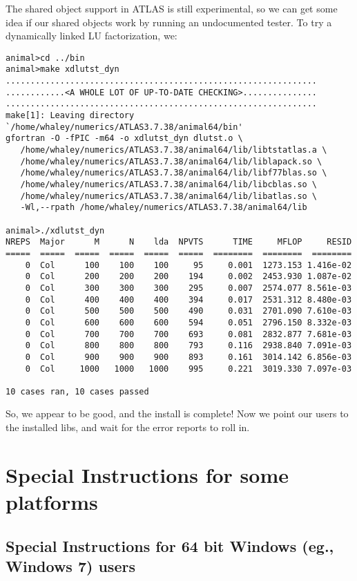 \documentclass[11pt]{article}
\begin{document}
The shared object support in ATLAS is still experimental, so we
can get some idea if our shared objects work by running an undocumented
tester.  To try a dynamically linked LU factorization, we:
\begin{footnotesize}
\begin{verbatim}
animal>cd ../bin
animal>make xdlutst_dyn
...............................................................
............<A WHOLE LOT OF UP-TO-DATE CHECKING>...............
...............................................................
make[1]: Leaving directory `/home/whaley/numerics/ATLAS3.7.38/animal64/bin'
gfortran -O -fPIC -m64 -o xdlutst_dyn dlutst.o \
   /home/whaley/numerics/ATLAS3.7.38/animal64/lib/libtstatlas.a \
   /home/whaley/numerics/ATLAS3.7.38/animal64/lib/liblapack.so \
   /home/whaley/numerics/ATLAS3.7.38/animal64/lib/libf77blas.so \
   /home/whaley/numerics/ATLAS3.7.38/animal64/lib/libcblas.so \
   /home/whaley/numerics/ATLAS3.7.38/animal64/lib/libatlas.so \
   -Wl,--rpath /home/whaley/numerics/ATLAS3.7.38/animal64/lib

animal>./xdlutst_dyn
NREPS  Major      M      N    lda  NPVTS      TIME     MFLOP     RESID
=====  =====  =====  =====  =====  =====  ========  ========  ========
    0  Col      100    100    100     95     0.001  1273.153 1.416e-02
    0  Col      200    200    200    194     0.002  2453.930 1.087e-02
    0  Col      300    300    300    295     0.007  2574.077 8.561e-03
    0  Col      400    400    400    394     0.017  2531.312 8.480e-03
    0  Col      500    500    500    490     0.031  2701.090 7.610e-03
    0  Col      600    600    600    594     0.051  2796.150 8.332e-03
    0  Col      700    700    700    693     0.081  2832.877 7.681e-03
    0  Col      800    800    800    793     0.116  2938.840 7.091e-03
    0  Col      900    900    900    893     0.161  3014.142 6.856e-03
    0  Col     1000   1000   1000    995     0.221  3019.330 7.097e-03

10 cases ran, 10 cases passed
\end{verbatim}
\end{footnotesize}
So, we appear to be good, and the install is complete!  Now we point our
users to the installed libs, and wait for the error reports to roll in.

\section{Special Instructions for some platforms}
\subsection{Special Instructions for 64 bit Windows (eg., Windows 7) users}
\label{sec-windows64}
\end{document}
